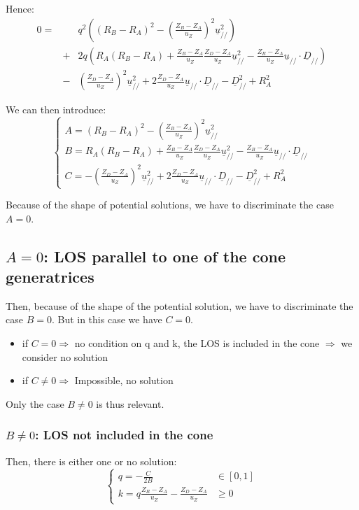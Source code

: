 \documentclass[a4paper,11pt,twoside,titlepage,openright]{book}
\numberwithin{equation}{section}
\newcommand{\ud}[1]{\underline{#1}}
\begin{document}
Hence:
$$
\begin{array}{lll}
0 = && q^2\left( (R_B-R_A)^2 - \left(\frac{Z_B-Z_A}{u_Z}\right)^2\ud{u}_{//}^2 \right)\\
& + & 2q\left( R_A(R_B-R_A) + \frac{Z_B-Z_A}{u_Z}\frac{Z_D-Z_A}{u_Z}\ud{u}_{//}^2 - \frac{Z_B-Z_A}{u_Z}\ud{u}_{//}\cdot\ud{D}_{//}  \right)\\
& - & \left(\frac{Z_D-Z_A}{u_Z}\right)^2\ud{u}_{//}^2 + 2\frac{Z_D-Z_A}{u_Z}\ud{u}_{//}\cdot\ud{D}_{//} - \ud{D}_{//}^2 + R_A^2 
\end{array}
$$

We can then introduce:
$$
\left\{
\begin{array}{ll}
A = (R_B-R_A)^2 - \left(\frac{Z_B-Z_A}{u_Z}\right)^2\ud{u}_{//}^2\\
B = R_A(R_B-R_A) + \frac{Z_B-Z_A}{u_Z}\frac{Z_D-Z_A}{u_Z}\ud{u}_{//}^2 - \frac{Z_B-Z_A}{u_Z}\ud{u}_{//}\cdot\ud{D}_{//}\\
C = -\left(\frac{Z_D-Z_A}{u_Z}\right)^2\ud{u}_{//}^2 + 2\frac{Z_D-Z_A}{u_Z}\ud{u}_{//}\cdot\ud{D}_{//} - \ud{D}_{//}^2 + R_A^2
\end{array}
\right.
$$

Because of the shape of potential solutions, we have to discriminate the case $A=0$.

\subsection{$A=0$: LOS parallel to one of the cone generatrices}

Then, because of the shape of the potential solution, we have to discriminate the case $B=0$.
But in this case we have $C=0$. 
\begin{itemize}
\item if $C=0 \Rightarrow$ no condition on q and k, the LOS is included in the cone $\Rightarrow$ we consider no solution
\item if $C\neq 0 \Rightarrow$ Impossible, no solution
\end{itemize}

Only the case $B\neq 0$ is thus relevant.

\subsubsection{$B\neq0$: LOS not included in the cone}

Then, there is either one or no solution:
$$
\left\{
\begin{array}{ll}
q = -\frac{C}{2B} & \in [0,1]\\
k = q\frac{Z_B-Z_A}{u_Z} - \frac{Z_D-Z_A}{u_Z} & \geq 0
\end{array}
\right.
$$
\end{document}
